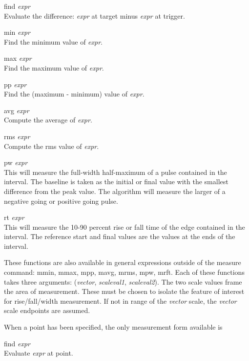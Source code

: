 \begin{description}
\item{{\vt find} {\it expr}}\\
Evaluate the difference:  {\it expr} at target minus {\it expr} at
trigger.
\item{{\vt min} {\it expr}}\\
Find the minimum value of {\it expr\/}.
\item{{\vt max} {\it expr}}\\
Find the maximum value of {\it expr\/}.
\item{{\vt pp} {\it expr}}\\
Find the (maximum - minimum) value of {\it expr\/}.
\item{{\vt avg} {\it expr}}\\
Compute the average of {\it expr\/}.
\item{{\vt rms} {\it expr}}\\
Compute the rms value of {\it expr\/}.
\item{{\vt pw} {\it expr}}\\
This will measure the full-width half-maximum of a pulse contained in
the interval.  The baseline is taken as the initial or final value
with the smallest difference from the peak value.  The algorithm will
measure the larger of a negative going or positive going pulse.
\item{{\vt rt} {\it expr}}\\
This will measure the 10-90 percent rise or fall time of the edge
contained in the interval.  The reference start and final values are
the values at the ends of the interval.
\end{description}

These functions are also available in general expressions outside of
the {\cb measure} command:  {\cb mmin}, {\cb mmax}, {\cb mpp}, {\cb
mavg}, {\cb mrms}, {\cb mpw}, {\cb mrft}.  Each of these functions
takes three arguments:  ({\it vector\/}, {\it scaleval1\/}, {\it
scaleval2\/}).  The two scale values frame the area of measurement. 
These must be chosen to isolate the feature of interest for
rise/fall/width measurement.  If not in range of the {\it vector}
scale, the {\it vector} scale endpoints are assumed.

When a point has been specified, the only measurement form
available is

\begin{description}
\item{{\vt find} {\it expr}}\\
Evaluate {\it expr} at point.
\end{description}

